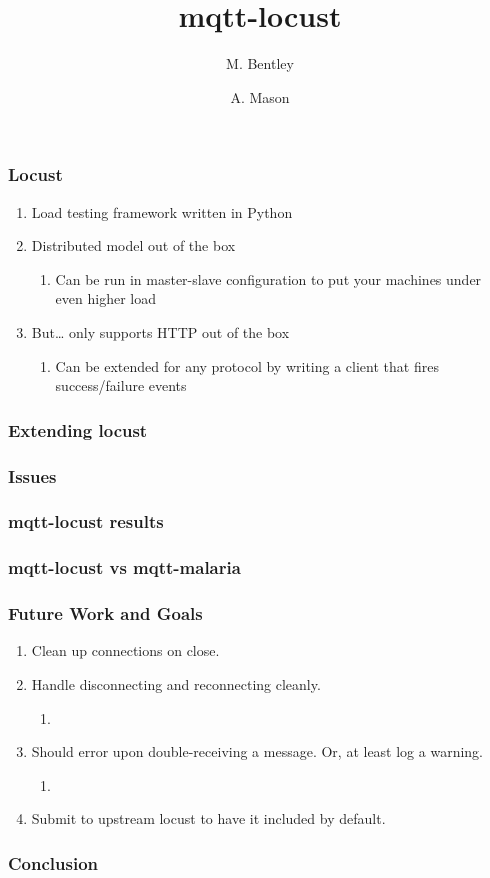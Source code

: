 \documentclass{beamer}
\title{mqtt-locust}
\author[Bentley, Mason]
{M. Bentley \and A. Mason}
\begin{document}
\frame{\titlepage}

\begin{frame}
    \frametitle{Locust}
    \begin{enumerate}
        \item Load testing framework written in Python
        \item
            Distributed model out of the box
            \begin{enumerate}
                \item Can be run in master-slave configuration to put your
                machines under even higher load
            \end{enumerate}
        \item
            But… only supports HTTP out of the box
            \begin{enumerate}
                \item Can be extended for any protocol by writing a client that
                fires success/failure events
            \end{enumerate}
    \end{enumerate}
\end{frame}

\begin{frame}
    \frametitle{Extending locust}
\end{frame}

\begin{frame}
    \frametitle{Issues}
\end{frame}

\begin{frame}
    \frametitle{mqtt-locust results}
\end{frame}

\begin{frame}
    \frametitle{mqtt-locust vs mqtt-malaria}
\end{frame}

\begin{frame}
    \frametitle{Future Work and Goals}
    \begin{enumerate}
        \item
            Clean up connections on close.
        \item
            Handle disconnecting and reconnecting cleanly.
            \begin{enumerate}
                \item
            \end{enumerate}
        \item
            Should error upon double-receiving a message. Or, at least log a
            warning.
            \begin{enumerate}
                \item
            \end{enumerate}
        \item
            Submit to upstream locust to have it included by default.
    \end{enumerate}
\end{frame}

\begin{frame}
    \frametitle{Conclusion}
\end{frame}
\end{document}
